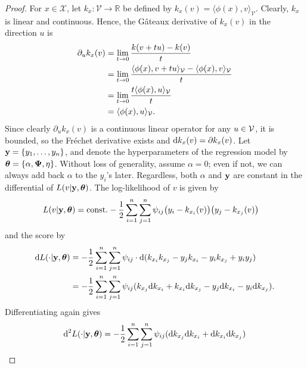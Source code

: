 \begin{proof}
	For $x \in \mathcal X$, let $k_x:\mathcal V \rightarrow \mathbb R$ be defined by $k_x(v) = \langle \phi(x), v \rangle_{\mathcal V}$. 
	Clearly, $k_x$ is linear and continuous.
	Hence, the Gâteaux derivative of $k_x(v)$ in the direction $u$ is
	\begin{align*}
		\partial_u k_x(v)	
		&= \lim_{t \rightarrow 0} \frac{k(v+t u) - k(v)}{t} \\
		&= \lim_{t \rightarrow 0} \frac{\langle \phi(x), v+t u \rangle_{{\mathcal V}} - \langle \phi(x), v \rangle_{{\mathcal V}}}{t} \\
		&= \lim_{t \rightarrow 0} \frac{t\langle \phi(x), u \rangle_{{\mathcal V}}}{t} \\
		&= \langle \phi(x), u \rangle_{{\mathcal V}}.
	\end{align*}
    Since clearly $\partial_u k_x(v)$ is a continuous linear operator for any $u\in{\mathcal V}$, it is bounded, so the Fréchet derivative exists and $\text{d} k_x(v) = \partial k_x(v)$.
	Let ${\mathbf y} = \{y_1,\dots,y_n\}$, and denote the hyperparameters of the regression model by ${\bm\theta} = \{ \alpha,{\bm\Psi},\eta \}$.
	Without loss of generality, assume $\alpha = 0$; even if not, we can always add back $\alpha$ to the $y_i$'s later.
	Regardless, both $\alpha$ and ${\mathbf y}$ are constant in the differential of $L(v|{\mathbf y}, {\bm\theta})$.
	The log-likelihood of $v$ is given by
	\begin{align*}
		L(v|{\mathbf y},{\bm\theta}) 
		&= \text{const.}\hspace{0.01em} - \frac{1}{2} \sum_{i=1}^n\sum_{j=1}^n \psi_{ij}\big(y_i - k_{x_i}(v)\big)\big(y_j  - k_{x_j}(v)\big)
	\end{align*}
	and the score by
	\begin{align*}
		\text{d} L(\cdot|{\mathbf y},{\bm\theta})
		&= - \frac{1}{2} \sum_{i=1}^n\sum_{j=1}^n \psi_{ij} \cdot \text{d} (k_{x_i}k_{x_j} - y_jk_{x_i} - y_ik_{x_j} + y_iy_j )  \\
		&= - \frac{1}{2} \sum_{i=1}^n\sum_{j=1}^n \psi_{ij} (k_{x_j} \text{d} k_{x_i}  + k_{x_i}\text{d} k_{x_j} - y_j\text{d} k_{x_i} - y_i\text{d} k_{x_j} ).
	\end{align*}
	Differentiating again gives
	\begin{align*}
		\d^2 L(\cdot|\by,\btheta)
		&= - \frac{1}{2} \sum_{i=1}^n\sum_{j=1}^n \psi_{ij} (\d k_{x_j} \d k_{x_i}  + \d k_{x_i}\d k_{x_j}) \\

\end{align*}
\end{proof}

